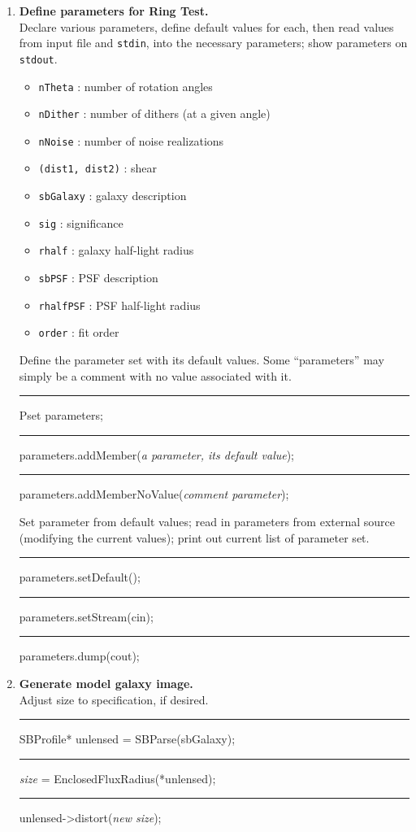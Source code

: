 \documentclass[useAMS,usenatbib,usegraphicx]{mn2e}
\begin{document}
\begin{enumerate}
\item {\bf Define parameters for Ring Test.} \\
Declare various parameters, define default values for each, then read values
from input file and {\tt stdin}, into the necessary parameters; show parameters on {\tt stdout}.
\begin{itemize}
 \item {\tt nTheta} : number of rotation angles 
 \item {\tt nDither} : number of dithers (at a given angle)
 \item {\tt nNoise} : number of noise realizations 
 \item {\tt (dist1, dist2)} : shear
 \item {\tt sbGalaxy} : galaxy description 
 \item {\tt sig} : significance 
 \item {\tt rhalf} : galaxy half-light radius
 \item {\tt sbPSF} : PSF description
 \item {\tt rhalfPSF} : PSF half-light radius
 \item {\tt order} : fit order
\end{itemize}
Define the parameter set with its default values.  Some ``parameters'' may simply be a comment
with no value associated with it. \\
\begin{boxit}
  {\tt \rule{0.1in}{0in} Pset parameters; \\
    \rule{0.1in}{0in} parameters.addMember({\it a parameter, its default value}); \\
    \rule{0.1in}{0in} parameters.addMemberNoValue({\it comment parameter});}
\end{boxit}
Set parameter from default values; read in parameters from external source (modifying the 
current values); print out current list of parameter set. \\
\begin{boxit}
  {\tt \rule{0.1in}{0in} parameters.setDefault(); \\ 
    \rule{0.1in}{0in} parameters.setStream(cin); \\ 
    \rule{0.1in}{0in} parameters.dump(cout);}
\end{boxit}

\item {\bf Generate model galaxy image.}  \\
Adjust size to specification, if desired.  \\
\begin{boxit}
  {\tt \rule{0.1in}{0in} SBProfile*  unlensed = SBParse(sbGalaxy); \\
    \rule{0.1in}{0in} {\it size} = EnclosedFluxRadius(*unlensed); \\
    \rule{0.1in}{0in} unlensed->distort({\it new size}); } \\
\end{boxit}


\end{enumerate}
\end{document}
